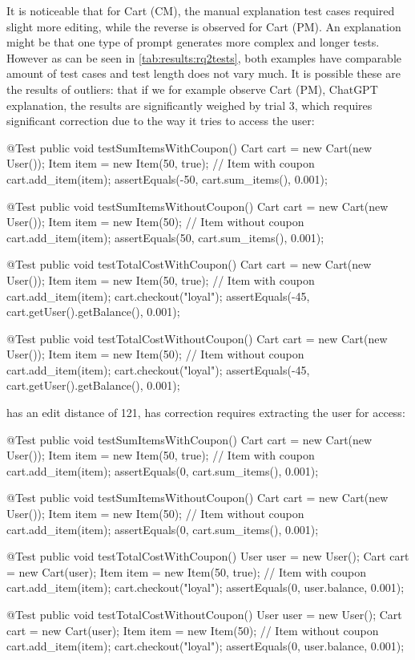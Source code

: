 It is noticeable that for Cart (CM), the manual explanation test cases required slight more editing, while the reverse
is observed for Cart (PM). An explanation might be that one type of prompt generates more complex and longer tests. However as can be seen in
\cref{tab:results:rq2tests}, both examples have comparable amount of test cases and test length does not vary much.
It is possible these are the results of outliers: that if we for example observe Cart (PM), ChatGPT explanation, the results are significantly weighed by
trial 3, which requires significant correction due to the way it tries to access the user:
\begin{response}
@Test
public void testSumItemsWithCoupon() {
    Cart cart = new Cart(new User());
    Item item = new Item(50, true); // Item with coupon
    cart.add_item(item);
    assertEquals(-50, cart.sum_items(), 0.001);
}

@Test
public void testSumItemsWithoutCoupon() {
    Cart cart = new Cart(new User());
    Item item = new Item(50); // Item without coupon
    cart.add_item(item);
    assertEquals(50, cart.sum_items(), 0.001);
}

@Test
public void testTotalCostWithCoupon() {
    Cart cart = new Cart(new User());
    Item item = new Item(50, true); // Item with coupon
    cart.add_item(item);
    cart.checkout("loyal");
    assertEquals(-45, cart.getUser().getBalance(), 0.001);
}

@Test
public void testTotalCostWithoutCoupon() {
    Cart cart = new Cart(new User());
    Item item = new Item(50); // Item without coupon
    cart.add_item(item);
    cart.checkout("loyal");
    assertEquals(-45, cart.getUser().getBalance(), 0.001);
}
\end{response}
has an edit distance of 121, has correction requires extracting the user for access:
\begin{response}
@Test
public void testSumItemsWithCoupon() {
    Cart cart = new Cart(new User());
    Item item = new Item(50, true); // Item with coupon
    cart.add_item(item);
    assertEquals(0, cart.sum_items(), 0.001);
}

@Test
public void testSumItemsWithoutCoupon() {
    Cart cart = new Cart(new User());
    Item item = new Item(50); // Item without coupon
    cart.add_item(item);
    assertEquals(0, cart.sum_items(), 0.001);
}

@Test
public void testTotalCostWithCoupon() {
    User user = new User();
    Cart cart = new Cart(user);
    Item item = new Item(50, true); // Item with coupon
    cart.add_item(item);
    cart.checkout("loyal");
    assertEquals(0, user.balance, 0.001);
}

@Test
public void testTotalCostWithoutCoupon() {
    User user = new User();
    Cart cart = new Cart(user);
    Item item = new Item(50); // Item without coupon
    cart.add_item(item);
    cart.checkout("loyal");
    assertEquals(0, user.balance, 0.001);
}
\end{response}
